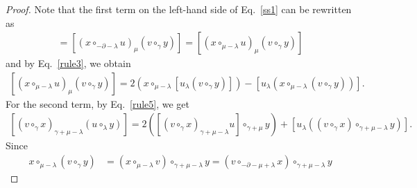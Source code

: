 \documentclass[10pt,a4paper]{amsart}
\begin{document}
\begin{proof}
Note that the first term on the left-hand side of Eq.~\eqref{ss1} can be rewritten as
   \begin{align*}
      [(u\circ_{\lambda}x)_{\mu}(v\circ_{\gamma}y)]=[(x\circ_{-\partial-\lambda}u)_{\mu}(v\circ_{\gamma}y)]
      =[(x\circ_{\mu-\lambda}u)_{\mu}(v\circ_{\gamma}y)]
   \end{align*}
and by Eq.~\eqref{rule3}, we obtain
   \begin{align}\label{f5}
      [(x\circ_{\mu-\lambda}u)_{\mu}(v\circ_{\gamma}y)]={2}(x\circ_{\mu-\lambda}[u_{\lambda}(v\circ_{\gamma}y)])-[u_{\lambda}(x\circ_{\mu-\lambda}(v\circ_{\gamma}y))].
   \end{align}
For the second term, by Eq.~\eqref{rule5}, we get
   \begin{align}\label{f6}
      [(v\circ_{\gamma}x)_{{\gamma+\mu-\lambda}}(u\circ_{\lambda}y)]={2}([(v\circ_{\gamma}x)_{\gamma+\mu-\lambda}u]\circ_{\gamma+\mu}y)+[u_{\lambda}((v\circ_{\gamma}x)\circ_{\gamma+\mu-\lambda}y)].
   \end{align}
Since
   \begin{align*}
      x\circ_{\mu-\lambda}(v\circ_{\gamma}y)&=(x\circ_{\mu-\lambda}v)\circ_{\gamma+\mu-\lambda}y=(v\circ_{-\partial-\mu+\lambda}x)\circ_{\gamma+\mu-\lambda}y

\end{align*}
\end{proof}
\end{document}
